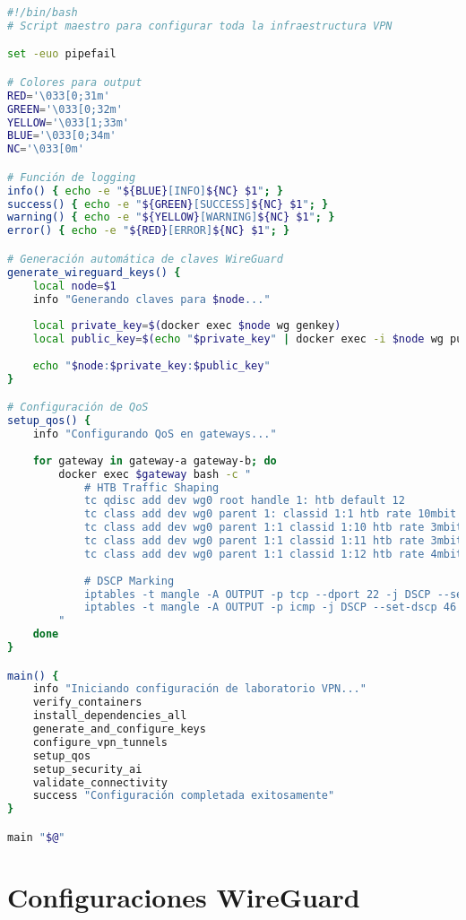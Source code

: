 \begin{lstlisting}[language=bash, caption=setup\_network.sh (extracto principal)]
#!/bin/bash
# Script maestro para configurar toda la infraestructura VPN

set -euo pipefail

# Colores para output
RED='\033[0;31m'
GREEN='\033[0;32m'
YELLOW='\033[1;33m'
BLUE='\033[0;34m'
NC='\033[0m'

# Función de logging
info() { echo -e "${BLUE}[INFO]${NC} $1"; }
success() { echo -e "${GREEN}[SUCCESS]${NC} $1"; }
warning() { echo -e "${YELLOW}[WARNING]${NC} $1"; }
error() { echo -e "${RED}[ERROR]${NC} $1"; }

# Generación automática de claves WireGuard
generate_wireguard_keys() {
    local node=$1
    info "Generando claves para $node..."
    
    local private_key=$(docker exec $node wg genkey)
    local public_key=$(echo "$private_key" | docker exec -i $node wg pubkey)
    
    echo "$node:$private_key:$public_key"
}

# Configuración de QoS
setup_qos() {
    info "Configurando QoS en gateways..."
    
    for gateway in gateway-a gateway-b; do
        docker exec $gateway bash -c "
            # HTB Traffic Shaping
            tc qdisc add dev wg0 root handle 1: htb default 12
            tc class add dev wg0 parent 1: classid 1:1 htb rate 10mbit
            tc class add dev wg0 parent 1:1 classid 1:10 htb rate 3mbit ceil 5mbit
            tc class add dev wg0 parent 1:1 classid 1:11 htb rate 3mbit ceil 7mbit
            tc class add dev wg0 parent 1:1 classid 1:12 htb rate 4mbit ceil 10mbit
            
            # DSCP Marking
            iptables -t mangle -A OUTPUT -p tcp --dport 22 -j DSCP --set-dscp 46
            iptables -t mangle -A OUTPUT -p icmp -j DSCP --set-dscp 46
        "
    done
}

main() {
    info "Iniciando configuración de laboratorio VPN..."
    verify_containers
    install_dependencies_all
    generate_and_configure_keys
    configure_vpn_tunnels
    setup_qos
    setup_security_ai
    validate_connectivity
    success "Configuración completada exitosamente"
}

main "$@"
\end{lstlisting}

\section{Configuraciones WireGuard}

